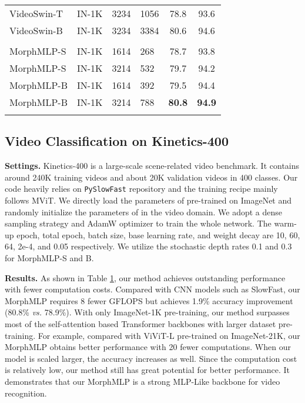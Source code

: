 \documentclass[runningheads]{llncs}
\begin{document}
\begin{table}[t]
{\begin{tabular}{l|l|l|l|cc}
		VideoSwin-T\cite{video_swin}  &IN-1K & 3234 & 1056 & 78.8  &93.6  \\
		VideoSwin-B\cite{video_swin}  &IN-1K & 3234 & 3384 & 80.6  &94.6  \\
	    \Xhline{0.7pt}
        \multicolumn{6}{c}{Self-Attention Free -- MLP-Like} \\
	    \Xhline{0.7pt}
		MorphMLP-S & IN-1K & 1614 & 268 &78.7 &93.8  \\
		MorphMLP-S & IN-1K & 3214 &532 &79.7 &94.2
		\\
		MorphMLP-B & IN-1K & 1614 &392 &79.5 &94.4
		\\
		MorphMLP-B & IN-1K & 3214 &788 &\textbf{80.8} &\textbf{94.9}
		\\
	\Xhline{1.0pt}
	\end{tabular}
    }
    \label{sota_k400}

\end{table}  
 

\subsection{Video Classification on Kinetics-400}

\noindent
\textbf{Settings.} Kinetics-400\cite{k400} is a large-scale scene-related video benchmark.
It contains around 240K training videos and about 20K validation videos in 400 classes.
Our code heavily relies on \texttt{PySlowFast} \cite{pyslowfast} repository and the training recipe mainly follows MViT\cite{mvit}.
We directly load the parameters of  pre-trained on ImageNet and randomly initialize the parameters of  in the video domain.
We adopt a dense sampling strategy \cite{non_local} and AdamW optimizer to train the whole network.
The warm-up epoch, total epoch, batch size, base learning rate, and weight decay are 10, 60, 64, 2e-4, and 0.05 respectively.
We utilize the stochastic depth rates 0.1 and 0.3 for MorphMLP-S and B.


\noindent
\textbf{Results.} 
As shown in Table \ref{sota_k400}, our method achieves  outstanding performance with fewer computation costs.  Compared with CNN models such as SlowFast\cite{slowfast}, our MorphMLP requires 8 fewer GFLOPS but  achieves 1.9\% accuracy improvement (80.8\% \textit{vs.} 78.9\%). With only ImageNet-1K pre-training, our method surpasses most of the  self-attention based Transformer backbones with larger dataset pre-training.
For example, compared with ViViT-L\cite{vivit} pre-trained on ImageNet-21K, our MorphMLP obtains better
performance with 20 fewer computations. When our model is scaled larger, the accuracy increases as well. Since the computation cost is relatively low, our method still has great potential for better performance. It demonstrates that our MorphMLP is a strong MLP-Like backbone for video recognition.
\end{document}
